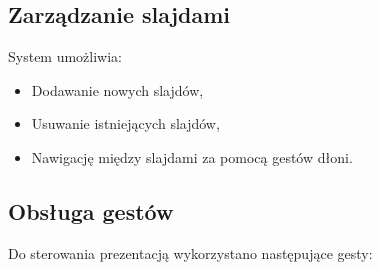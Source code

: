 \documentclass[12pt,a4paper]{article}
\begin{document}
\subsection{Zarządzanie slajdami}
System umożliwia:
\begin{itemize}
    \item Dodawanie nowych slajdów,
    \item Usuwanie istniejących slajdów,
    \item Nawigację między slajdami za pomocą gestów dłoni.
\end{itemize}

\subsection{Obsługa gestów}
Do sterowania prezentacją wykorzystano następujące gesty:
\end{document}
